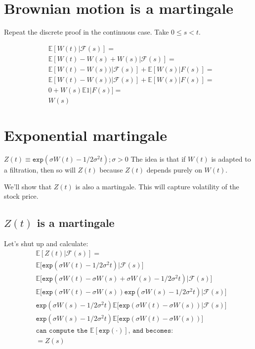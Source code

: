 \documentclass{book}
\newcommand{\F}{\ensuremath{\mathcal{F}}}
\newcommand{\E}{\ensuremath{\mathbb{E}}}
\theoremstyle{definition}
\begin{document}
\section{Brownian motion is a martingale}

Repeat the discrete proof in the continuous case. Take $0 \leq s < t$.

\begin{align*}
& \E[W(t) | \F(s)] = \\
& \E[W(t) - W(s) + W(s) | \F(s)] = \\
& \E[W(t) - W(s)) | \F(s)] + \E[W(s)|F(s)] = \\
& \E[W(t) - W(s)) | \F(s)] + \E[W(s)|F(s)] = \\
& 0 + W(s) \E1|F(s)] = \\
& W(s)                    
\end{align*}

\section{Exponential martingale}

$Z(t)  \equiv \texttt{exp}\left( \sigma W(t) - 1/2 \sigma^2 t \right); \sigma > 0$
The idea is that if $W(t)$ is adapted to a filtration, then so will $Z(t)$
because $Z(t)$ depends purely on $W(t)$.

We'll show that $Z(t)$ is also a martingale. This will capture volatility of
the stock price.

\subsection{$Z(t)$ is a martingale}
Let's shut up and calculate:
\begin{align*}
&\E[Z(t)|\F(s)]  = \\
&\E\bigg[\texttt{exp}\left( \sigma W(t) - 1/2 \sigma^2 t \right) | \F(s) \bigg] \\
&\E\bigg[\texttt{exp}\left( \sigma W(t) - \sigma W(s) + \sigma W(s) - 1/2 \sigma^2 t \right) | \F(s) \bigg] \\
&\E\bigg[\texttt{exp}\left( \sigma W(t) - \sigma W(s) \right) \texttt{exp} \left(\sigma W(s) - 1/2 \sigma^2 t \right) | \F(s) \bigg] \\
& \texttt{exp} \left(\sigma W(s) - 1/2 \sigma^2 t \right) \E\bigg[\texttt{exp}\left( \sigma W(t) - \sigma W(s) \right) | \F(s) \bigg] \\
& \texttt{exp} \left(\sigma W(s) - 1/2 \sigma^2 t \right) \E\bigg[\texttt{exp}\left( \sigma W(t) - \sigma W(s) \right)\bigg] \\
&\texttt{can compute the $\E[\texttt{exp}(\cdot)]$, and becomes:} \\
& = Z(s)
\end{align*}
\end{document}
